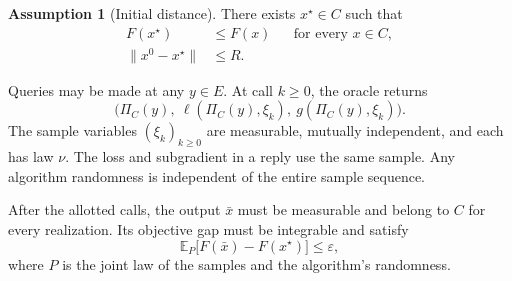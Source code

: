 \documentclass[10pt]{article}
\theoremstyle{definition}
\newtheorem{assumption}{Assumption}
\begin{document}
\begin{assumption}[Initial distance]
There exists $x^\star\in C$ such that
\[
\begin{aligned}
F(x^\star)&\leq F(x) &&\text{for every }x\in C,\\
\|x^0-x^\star\|&\leq R.
\end{aligned}
\]
\end{assumption}

Queries may be made at any $y\in E$. At call $k\geq0$, the oracle returns
\[
\bigl(\Pi_C(y),\ \ell(\Pi_C(y),\xi_k),\
 g(\Pi_C(y),\xi_k)\bigr).
\]
The sample variables $(\xi_k)_{k\geq0}$ are measurable, mutually independent, and each has law $\nu$. The loss and subgradient in a reply use the same sample. Any algorithm randomness is independent of the entire sample sequence.

After the allotted calls, the output $\bar{x}$ must be measurable and belong to $C$ for every realization. Its objective gap must be integrable and satisfy
\[
\mathbb{E}_{P}\bigl[F(\bar{x})-F(x^\star)\bigr]\leq\varepsilon,
\]
where $P$ is the joint law of the samples and the algorithm's randomness.
\end{document}
